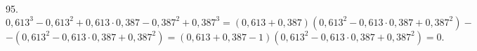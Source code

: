 95. $0,613^3-0,613^2+0,613\cdot0,387-0,387^2+0,387^3=(0,613+0,387)(0,613^2-0,613\cdot0,387+0,387^2)-$\\$-(0,613^2-0,613\cdot0,387+0,387^2)=
(0,613+0,387-1)(0,613^2-0,613\cdot0,387+0,387^2)=0.$\\
